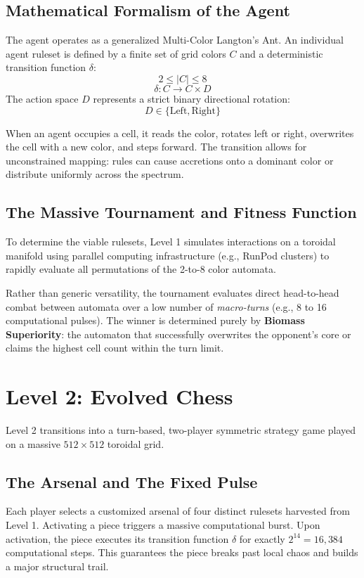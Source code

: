 \documentclass[11pt]{article}
\begin{document}
	\subsection{Mathematical Formalism of the Agent}
	The agent operates as a generalized Multi-Color Langton's Ant. %
	An individual agent ruleset is defined by a finite set of grid colors $C$ and a deterministic transition function $\delta$:
	\begin{equation}
		2 \le |C| \le 8 %
	\end{equation}
	\begin{equation}
		\delta: C \rightarrow C \times D
	\end{equation}
	The action space $D$ represents a strict binary directional rotation:
	\begin{equation}
		D \in \{ \text{Left}, \text{Right} \}
	\end{equation}
	
	When an agent occupies a cell, it reads the color, rotates left or right, overwrites the cell with a new color, and steps forward. %
	The transition allows for unconstrained mapping: rules can cause accretions onto a dominant color or distribute uniformly across the spectrum.
	
	\subsection{The Massive Tournament and Fitness Function}
	To determine the viable rulesets, Level 1 simulates interactions on a toroidal manifold %
	using parallel computing infrastructure (e.g., RunPod clusters) to rapidly evaluate all permutations of the 2-to-8 color automata.
	
	Rather than generic versatility, the tournament evaluates direct head-to-head combat between automata over a low number of \textit{macro-turns} (e.g., 8 to 16 computational pulses). The winner is determined purely by \textbf{Biomass Superiority}: the automaton that successfully overwrites the opponent's core or claims the highest cell count within the turn limit.
	
	\section{Level 2: Evolved Chess}
	Level 2 transitions into a turn-based, two-player symmetric strategy game played on a massive $512 \times 512$ toroidal grid. %
	
	\subsection{The Arsenal and The Fixed Pulse}
	Each player selects a customized arsenal of four distinct rulesets harvested from Level 1. %
	Activating a piece triggers a massive computational burst. %
	Upon activation, the piece executes its transition function $\delta$ for exactly $2^{14} = 16,384$ computational steps. %
	This guarantees the piece breaks past local chaos and builds a major structural trail. %
	
\end{document}

